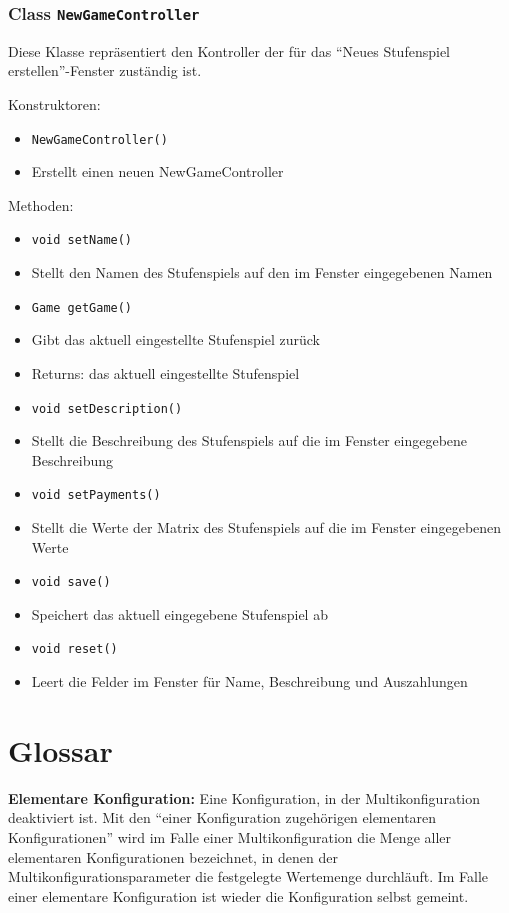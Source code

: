 \documentclass[parskip=full,11pt]{scrartcl}
\begin{document}
\subsubsection{Class \texttt{NewGameController}}
Diese Klasse repräsentiert den Kontroller der für das \enquote{Neues Stufenspiel erstellen}-Fenster zuständig ist.

Konstruktoren:
\begin{itemize}\itemsep -10pt
\item \texttt{NewGameController()}
\item[] Erstellt einen neuen NewGameController
\end{itemize}

Methoden:
\begin{itemize}\itemsep -10pt
\item \texttt{void setName()}
\item[] Stellt den Namen des Stufenspiels auf den im Fenster eingegebenen Namen


\item \texttt{Game getGame()}
\item[] Gibt das aktuell eingestellte Stufenspiel zurück
\item[] Returns: das aktuell eingestellte Stufenspiel

\item \texttt{void setDescription()}
\item[] Stellt die Beschreibung des Stufenspiels auf die im Fenster eingegebene Beschreibung

\item \texttt{void setPayments()}
\item[] Stellt die Werte der Matrix des Stufenspiels auf die im Fenster eingegebenen Werte

\item\texttt{void save()}
\item[] Speichert das aktuell eingegebene Stufenspiel ab

\item \texttt{void reset()}
\item[] Leert die Felder im Fenster für Name, Beschreibung und Auszahlungen

\end{itemize}

\section{Glossar}
\textbf{Elementare Konfiguration:}
Eine Konfiguration, in der Multikonfiguration deaktiviert ist. Mit den \enquote{einer Konfiguration zugehörigen elementaren Konfigurationen} wird im Falle einer Multikonfiguration die Menge aller elementaren Konfigurationen bezeichnet, in denen der Multikonfigurationsparameter die festgelegte Wertemenge durchläuft. Im Falle einer elementare Konfiguration ist wieder die Konfiguration selbst gemeint.
\end{document}
